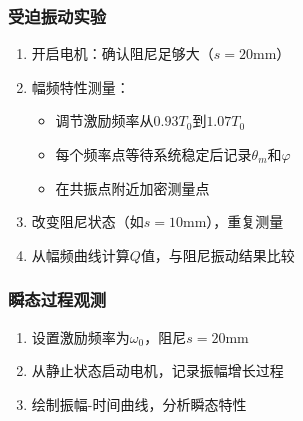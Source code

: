 \documentclass[UTF8]{ctexart}
\begin{document}
\subsubsection{受迫振动实验}
\begin{enumerate}
    \item 开启电机：确认阻尼足够大（$s=20$mm）
    \item 幅频特性测量：
    \begin{itemize}
        \item 调节激励频率从$0.93T_0$到$1.07T_0$
        \item 每个频率点等待系统稳定后记录$\theta_m$和$\varphi$
        \item 在共振点附近加密测量点
    \end{itemize}
    \item 改变阻尼状态（如$s=10$mm），重复测量
    \item 从幅频曲线计算$Q$值，与阻尼振动结果比较
\end{enumerate}

\subsubsection{瞬态过程观测}
\begin{enumerate}
    \item 设置激励频率为$\omega_0$，阻尼$s=20$mm
    \item 从静止状态启动电机，记录振幅增长过程
    \item 绘制振幅-时间曲线，分析瞬态特性
\end{enumerate}
\end{document}
